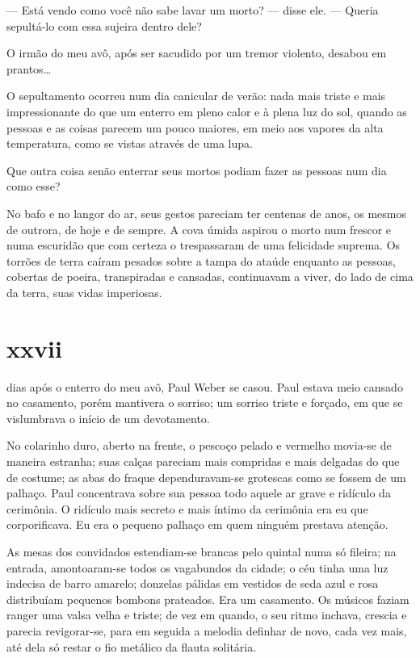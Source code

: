 --- Está vendo como você não sabe lavar um morto? --- disse ele. --- Queria
    sepultá-lo com essa sujeira dentro dele?

O irmão do meu avô, após ser sacudido por um tremor violento, desabou em
prantos\ldots{}

O sepultamento ocorreu num dia canicular de verão: nada mais triste e mais
impressionante do que um enterro em pleno calor e à plena luz do sol, quando
as pessoas e as coisas parecem um pouco maiores, em meio aos vapores da alta
temperatura, como se vistas através de uma lupa.

Que outra coisa senão enterrar seus mortos podiam fazer as pessoas num dia
como esse?

No bafo e no langor do ar, seus gestos pareciam ter centenas de anos, os
mesmos de outrora, de hoje e de sempre. A cova úmida aspirou o morto num
frescor e numa escuridão que com certeza o trespassaram de uma felicidade
suprema. Os torrões de terra caíram pesados sobre a tampa do ataúde enquanto
as pessoas, cobertas de poeira, transpiradas e cansadas, continuavam a viver,
do lado de cima da terra, suas vidas imperiosas. 


\section{xxvii} 

 dias após o enterro do meu avô, Paul Weber se casou. Paul estava meio cansado no casamento, porém mantivera o sorriso; um sorriso
triste e forçado, em que se vislumbrava o início de um devotamento.

No colarinho duro, aberto na frente, o pescoço pelado e vermelho movia-se de
maneira estranha; suas calças pareciam mais compridas e mais delgadas do que
de costume; as abas do fraque dependuravam-se grotescas como se fossem de um
palhaço. Paul concentrava sobre sua pessoa todo aquele ar grave e ridículo da
cerimônia. O ridículo mais secreto e mais íntimo da cerimônia era eu que
corporificava. Eu era o pequeno palhaço em quem ninguém prestava atenção.


As mesas dos convidados estendiam-se brancas pelo quintal numa só fileira; na
entrada, amontoaram-se todos os vagabundos da cidade; o céu tinha uma luz
indecisa de barro amarelo; donzelas pálidas em vestidos de seda azul e rosa
distribuíam pequenos bombons prateados. Era um casamento. Os músicos faziam
ranger uma valsa velha e triste; de vez em quando, o seu ritmo inchava,
crescia e parecia revigorar-se, para em seguida a melodia definhar de novo,
cada vez mais, até dela só restar o fio metálico da flauta solitária.

